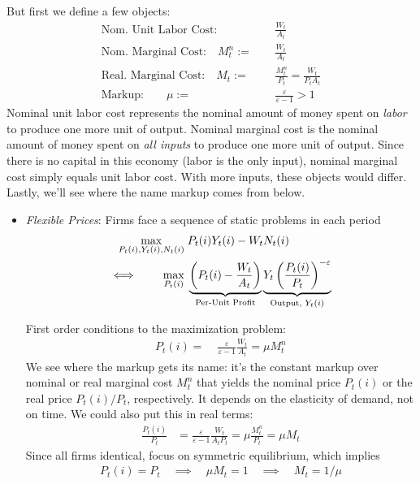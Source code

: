 \documentclass[12pt]{article}
\theoremstyle{plain}
\theoremstyle{definition}
\theoremstyle{remark}
\begin{document}
\begin{enumerate}[label=(\roman*)]
    But first we define a few objects:
    \begin{align*}
      \text{Nom. Unit Labor Cost:}\qquad\qquad
      &\;\frac{W_t}{A_t}
      \\
      \text{Nom. Marginal Cost:}\quad
      M_t^n :=&\; \frac{W_t}{A_t}
      \\
      \text{Real. Marginal Cost:}\quad
      M_t :=&\;
      \frac{M_t^n}{P_t}
      =
      \frac{W_t}{P_tA_t}
      \\
      \text{Markup:}\quad\quad
      \mu:= &\;\frac{\varepsilon}{\varepsilon-1} > 1
    \end{align*}
    Nominal unit labor cost represents the nominal amount of money spent
    on \emph{labor} to produce one more unit of output. Nominal marginal
    cost is the nominal amount of money spent on \emph{all inputs} to
    produce one more unit of output. Since there is no capital in this
    economy (labor is the only input), nominal marginal cost simply
    equals unit labor cost. With more inputs, these objects would
    differ. Lastly, we'll see where the name markup comes from below.
    \begin{itemize}
      \item \emph{Flexible Prices}:
        Firms face a sequence of static problems in each period
        \begin{align*}
          \max_{P_t(i),Y_t(i),N_t(i)}
          \;&P_t(i)Y_t(i) - W_tN_t(i)
          \\
          \iff\qquad
          \max_{P_t(i)}
          \;&
          \underbrace{%
          \left(
          P_t(i)
          - \frac{W_t}{A_t}
          \right)
          }_{\text{Per-Unit Profit}}
          \underbrace{%
          Y_t\left(\frac{P_t(i)}{P_t}\right)^{-\varepsilon}
          }_{\text{Output, $Y_t(i)$}}
        \end{align*}

        First order conditions to the maximization problem:
        \begin{align*}
          P_t(i) =& \;\frac{\varepsilon}{\varepsilon-1}\frac{W_t}{A_t}
          = \mu M_t^n
        \end{align*}
        We see where the markup gets its name: it's the constant markup
        over nominal or real marginal cost $M_t^n$ that yields the
        nominal price $P_t(i)$ or the real price $P_t(i)/P_t$,
        respectively. It depends on the elasticity of demand, not on
        time. We could also put this in real terms:
        \begin{align*}
          \frac{P_t(i)}{P_t} &=
          \frac{\varepsilon}{\varepsilon-1}\frac{W_t}{A_tP_t}
          =
          \mu \frac{M_t^n}{P_t}
          =
          \mu M_t
        \end{align*}
        Since all firms identical, focus on symmetric equilibrium, which
        implies
        \begin{align*}
          P_t(i)=P_t
          \quad\implies\quad
          \mu M_t=1
          \quad\implies\quad
          M_t = 1/\mu
        \end{align*}


\end{itemize}
\end{enumerate}
\end{document}
